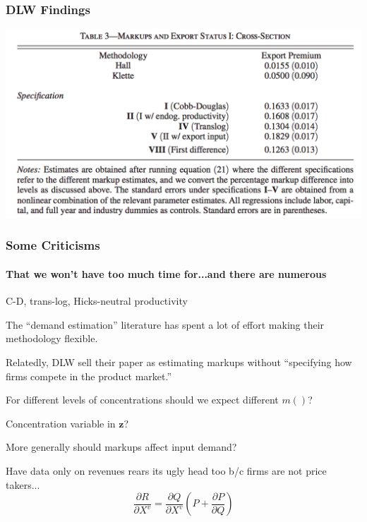 \documentclass[11pt, aspectratio=169]{beamer}
\newenvironment{wideitemize}{\itemize\addtolength{\itemsep}{10pt}}{\enditemize}
\begin{document}
\begin{frame}[c]\frametitle{DLW Findings}
    
\centering
\includegraphics[scale=.4]{DLW-Table3.png}

\end{frame}


\begin{frame}[c]\frametitle{Some Criticisms}
\framesubtitle{That we won't have too much time for...and there are numerous}

\begin{wideitemize}
	\item C-D, trans-log, Hicks-neutral productivity
	\begin{wideitemize}
		\item The ``demand estimation'' literature has spent a lot of effort making their methodology flexible.
	\end{wideitemize}
	\item Relatedly, DLW sell their paper as estimating markups without ``specifying how firms compete in the product market.''
	\begin{wideitemize}
		\item For different levels of concentrations should we expect different $m()$?
		\item Concentration variable in $\mathbf{z}$?
		\item More generally should markups affect input demand?
		\item Have data only on revenues rears its ugly head too b/c firms are not price takers...
		$$ \frac{\partial R}{\partial X^v} = \frac{\partial Q}{\partial X^v} (P + \frac{\partial P}{\partial Q}) $$
	\end{wideitemize}
	

\end{wideitemize}   

\end{frame}
\end{document}
